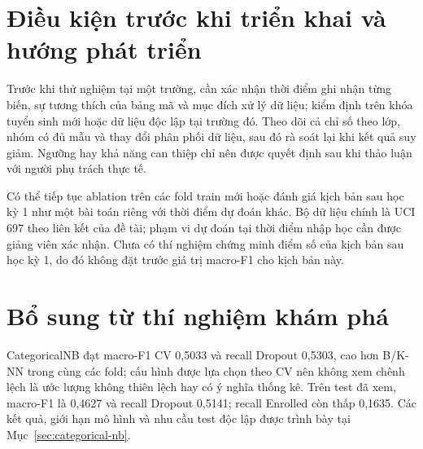 \section{Điều kiện trước khi triển khai và hướng phát triển}
Trước khi thử nghiệm tại một trường, cần xác nhận thời điểm ghi nhận từng biến, sự tương thích của bảng mã và mục đích xử lý dữ liệu; kiểm định trên khóa tuyển sinh mới hoặc dữ liệu độc lập tại trường đó. Theo dõi cả chỉ số theo lớp, nhóm có đủ mẫu và thay đổi phân phối dữ liệu, sau đó rà soát lại khi kết quả suy giảm. Ngưỡng hay khả năng can thiệp chỉ nên được quyết định sau khi thảo luận với người phụ trách thực tế.

Có thể tiếp tục ablation trên các fold train mới hoặc đánh giá kịch bản sau học kỳ 1 như một bài toán riêng với thời điểm dự đoán khác. Bộ dữ liệu chính là UCI 697 theo liên kết của đề tài; phạm vi dự đoán tại thời điểm nhập học cần được giảng viên xác nhận. Chưa có thí nghiệm chứng minh điểm số của kịch bản sau học kỳ 1, do đó không đặt trước giá trị macro-F1 cho kịch bản này.

\section{Bổ sung từ thí nghiệm khám phá}
CategoricalNB đạt macro-F1 CV 0,5033 và recall Dropout 0,5303, cao hơn B/K-NN trong cùng các fold; cấu hình được lựa chọn theo CV nên không xem chênh lệch là ước lượng không thiên lệch hay có ý nghĩa thống kê. Trên test đã xem, macro-F1 là 0,4627 và recall Dropout 0,5141; recall Enrolled còn thấp 0,1635. Các kết quả, giới hạn mô hình và nhu cầu test độc lập được trình bày tại Mục~\ref{sec:categorical-nb}.
